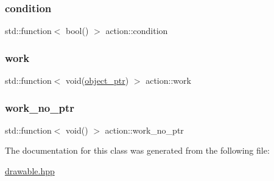 \subsubsection{\texorpdfstring{condition}{condition}}
{\footnotesize\ttfamily std\+::function$<$ bool() $>$ action\+::condition\hspace{0.3cm}{\ttfamily [private]}}

\mbox{\label{classaction_a711a393fce3b3b22930b651e24eda6c3}} 
\subsubsection{\texorpdfstring{work}{work}}
{\footnotesize\ttfamily std\+::function$<$ void(\hyperlink{drawable_8hpp_aab5add95f06d2ba25dbfed8eb07274fa}{object\+\_\+ptr}) $>$ action\+::work\hspace{0.3cm}{\ttfamily [private]}}

\mbox{\label{classaction_a2b895e3240bf7d69ae7f8e3bd7e563d6}} 
\subsubsection{\texorpdfstring{work\+\_\+no\+\_\+ptr}{work\_no\_ptr}}
{\footnotesize\ttfamily std\+::function$<$ void() $>$ action\+::work\+\_\+no\+\_\+ptr\hspace{0.3cm}{\ttfamily [private]}}



The documentation for this class was generated from the following file\+:\begin{DoxyCompactItemize}
\item 
\hyperlink{drawable_8hpp}{drawable.\+hpp}\end{DoxyCompactItemize}
